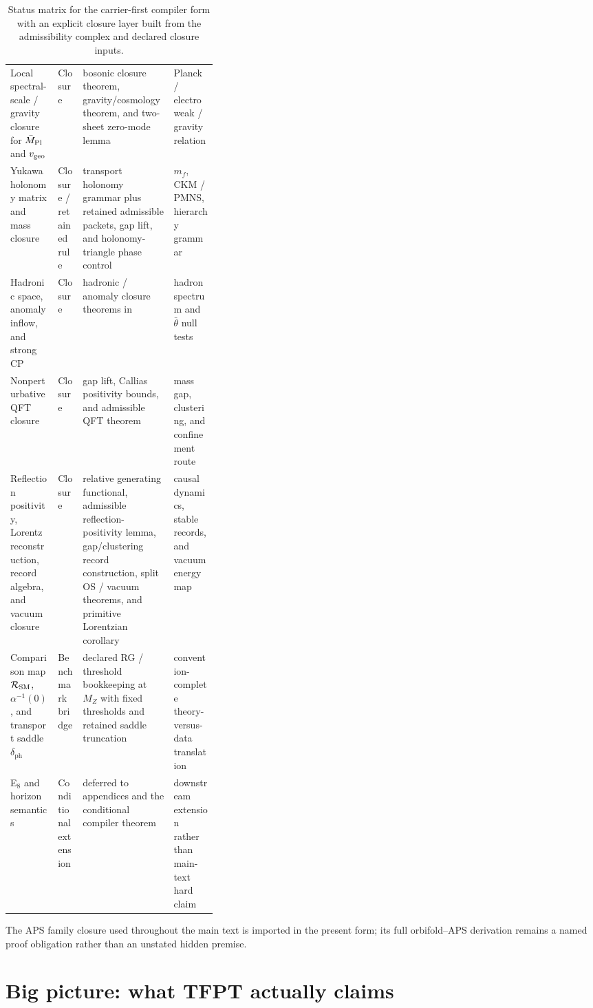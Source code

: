 \begin{table}[t]
\begin{tabularx}{\linewidth}{@{}>{\raggedright\arraybackslash}p{0.23\linewidth}>{\raggedright\arraybackslash}p{0.12\linewidth}YY@{}}
Local spectral-scale / gravity closure for $\bar M_{\mathrm{Pl}}$ and $v_{\mathrm{geo}}$ & Closure & bosonic closure theorem, gravity/cosmology theorem, and two-sheet zero-mode lemma & Planck / electroweak / gravity relation \\
Yukawa holonomy matrix and mass closure & Closure / retained rule & transport holonomy grammar plus retained admissible packets, gap lift, and holonomy-triangle phase control & $m_f$, CKM / PMNS, hierarchy grammar \\
Hadronic space, anomaly inflow, and strong CP & Closure & hadronic / anomaly closure theorems in  & hadron spectrum and $\bar\theta$ null tests \\
Nonperturbative QFT closure & Closure & gap lift, Callias positivity bounds, and admissible QFT theorem & mass gap, clustering, and confinement route \\
Reflection positivity, Lorentz reconstruction, record algebra, and vacuum closure & Closure & relative generating functional, admissible reflection-positivity lemma, gap/clustering record construction, split OS / vacuum theorems, and primitive Lorentzian corollary & causal dynamics, stable records, and vacuum energy map \\
Comparison map $\mathcal R_{\mathrm{SM}}$, $\alpha^{-1}(0)$, and transport saddle $\delta_{\mathrm{ph}}$ & Benchmark bridge & declared RG / threshold bookkeeping at $M_Z$ with fixed thresholds and retained saddle truncation & convention-complete theory-versus-data translation \\
E$_8$ and horizon semantics & Conditional extension & deferred to appendices and the conditional compiler theorem & downstream extension rather than main-text hard claim \\
\bottomrule
\end{tabularx}
\caption{Status matrix for the carrier-first compiler form with an explicit closure layer built from the admissibility complex and declared closure inputs.}
\label{tab:status-matrix}
\end{table}

The APS family closure used throughout the main text is imported in the present form; its full orbifold--APS derivation remains a named proof obligation rather than an unstated hidden premise.

\section{Big picture: what TFPT actually claims}

